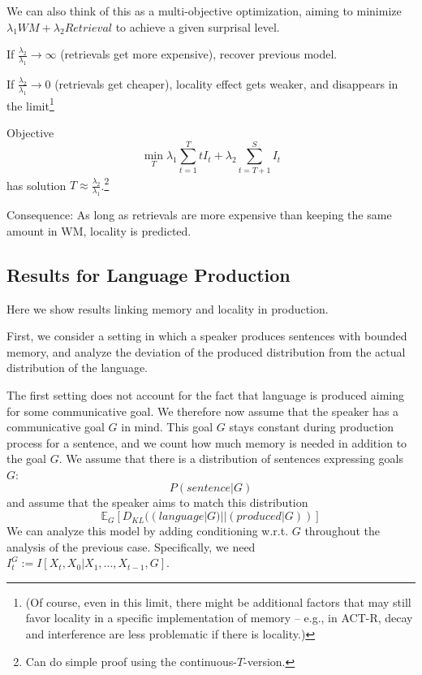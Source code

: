 \documentclass[11pt,letterpaper]{article}
\begin{document}
We can also think of this as a multi-objective optimization, aiming to minimize $\lambda_1 WM + \lambda_2 Retrieval$ to achieve a given surprisal level.

If $\frac{\lambda_2}{\lambda_1} \rightarrow \infty$ (retrievals get more expensive), recover previous model.

If $\frac{\lambda_2}{\lambda_1} \rightarrow 0$ (retrievals get cheaper), locality effect gets weaker, and disappears in the limit\footnote{(Of course, even in this limit, there might be additional factors that may still favor locality in a specific implementation of memory -- e.g., in ACT-R, decay and interference are less problematic if there is locality.)}

Objective
$$\min_{T} \lambda_1 \sum_{t=1}^T t I_t + \lambda_2 \sum_{t=T+1}^S I_t$$
has solution $T \approx \frac{\lambda_2}{\lambda_1}$.\footnote{Can do simple proof using the continuous-$T$-version.}


Consequence: As long as retrievals are more expensive than keeping the same amount in WM, locality is predicted.


\subsection{Results for Language Production}

Here we show results linking memory and locality in production.

First, we consider a setting in which a speaker produces sentences with bounded memory, and analyze the deviation of the produced distribution from the actual distribution of the language.


The first setting does not account for the fact that language is produced aiming for some communicative goal.
We therefore now assume that the speaker has a communicative goal $G$ in mind.
This goal $G$ stays constant during production process for a sentence, and we count how much memory is needed in addition to the goal $G$.
We assume that there is a distribution of sentences expressing goals $G$:
\begin{equation}
	P(sentence|G)
\end{equation}
and assume that the speaker aims to match this distribution
\begin{equation}
\mathbb{E}_G[D_{KL}((language|G)||(produced|G))]
\end{equation}
We can analyze this model by adding conditioning w.r.t. $G$ throughout the analysis of the previous case.
Specifically, we need $I_t^G := I[X_t, X_0|X_1, \dots, X_{t-1}, G]$.
\end{document}
